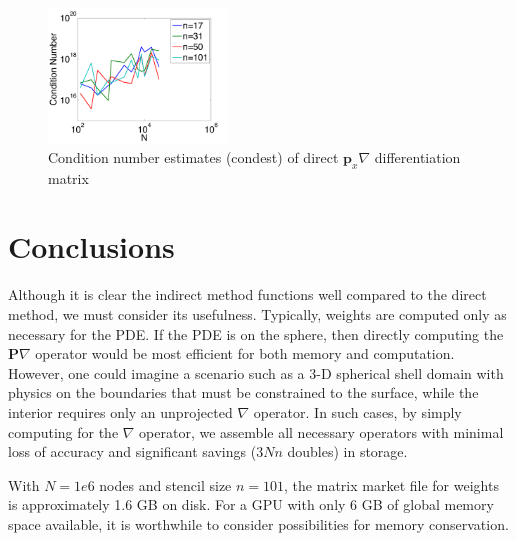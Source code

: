 \begin{figure}[htbp]
\centering
\includegraphics[width=0.425\textwidth]{figures/chapter2/compare_weight_generation/xsfc_vs_xsfc_alt_on_sph32/condest_dm_xsfc.pdf}
\caption{Condition number estimates (condest) of direct $\mathbf{p}_{x}\nabla$ differentiation matrix}
\end{figure}
\section{Conclusions}

Although it is clear the indirect method functions well compared to the direct method, we must consider its usefulness. Typically, weights are computed only as necessary for the PDE. If the PDE is on the sphere, then directly computing the $\mathbf{P}\nabla$ operator would be most efficient for both memory and computation. However, one could imagine a scenario such as a 3-D spherical shell domain with physics on the boundaries that must be constrained to the surface, while the interior requires only an unprojected $\nabla$ operator. In such cases, by simply computing for the $\nabla$ operator, we assemble all necessary operators with minimal loss of accuracy and significant savings ($3Nn$ doubles) in storage. 


With $N=1e6$ nodes and stencil size $n=101$, the matrix market file for weights is approximately 1.6 GB on disk. For a GPU with only 6 GB of global memory space available, it is worthwhile to consider possibilities for memory conservation. 


